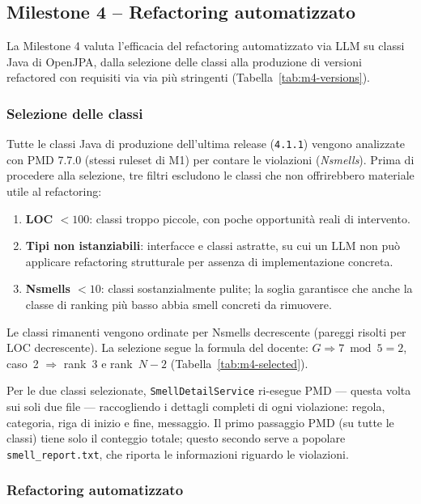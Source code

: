 \subsection{Milestone 4 -- Refactoring automatizzato}

La Milestone 4 valuta l'efficacia del refactoring automatizzato via LLM su classi
Java di OpenJPA, dalla selezione delle classi alla produzione di versioni refactored con requisiti via via più stringenti
(Tabella~\ref{tab:m4-versions}).

\subsubsection{Selezione delle classi}

Tutte le classi Java di produzione dell'ultima release (\texttt{4.1.1}) vengono
analizzate con PMD 7.7.0 (stessi ruleset di M1) per contare le violazioni
(\emph{Nsmells}). Prima di procedere alla selezione, tre filtri escludono le classi
che non offrirebbero materiale utile al refactoring:

\begin{enumerate}
  \item \textbf{LOC $< 100$}: classi troppo piccole, con poche opportunità reali di intervento.
  \item \textbf{Tipi non istanziabili}: interfacce e classi astratte, su cui un LLM
        non può applicare refactoring strutturale per assenza di implementazione concreta.
  \item \textbf{Nsmells $< 10$}: classi sostanzialmente pulite; la soglia garantisce che
        anche la classe di ranking più basso abbia smell concreti da rimuovere.
\end{enumerate}

Le classi rimanenti vengono ordinate per Nsmells decrescente (pareggi risolti per LOC
decrescente). La selezione segue la formula del docente:
$G \Rightarrow 7 \bmod 5 = 2$, caso~2 $\Rightarrow$ rank~$3$ e rank~$N{-}2$
(Tabella~\ref{tab:m4-selected}).

Per le due classi selezionate, \texttt{SmellDetailService} ri-esegue PMD — questa volta
sui soli due file — raccogliendo i dettagli completi di ogni violazione: regola, categoria,
riga di inizio e fine, messaggio. Il primo passaggio PMD (su tutte le classi) tiene solo il
conteggio totale; questo secondo serve a popolare \texttt{smell\_report.txt}, che riporta le informazioni
riguardo le violazioni.

\subsubsection{Refactoring automatizzato}

